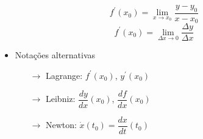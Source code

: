 \begin{frame}
\begin{columns}[onlytextwidth]
\begin{column}{0.5\textwidth}
\begin{itemize}
        \begin{equation*}
          f^{\prime}(x_{0}) = \lim_{x\to x_{0}}\frac{y - y_{0}}{x - x_{0}}
        \end{equation*}
        \begin{equation*}
          f^{\prime}(x_{0}) = \lim_{\Delta x\to 0}\frac{\Delta y}{\Delta x}
        \end{equation*}
      \end{itemize}
      \begin{itemize}
        \item Notações alternativas
        \begin{itemize}
          \item[$\to$] Lagrange: $f^{\prime}(x_{0})$, $y^{\prime}(x_{0})$
          \item[$\to$] Leibniz: $\dfrac{dy}{dx}(x_{0})$, $\dfrac{df}{dx}(x_{0})$
          \item[$\to$] Newton: $\dot{x}(t_{0}) = \dfrac{dx}{dt}(t_{0})$
        \end{itemize}
      \end{itemize}
    \end{column}
  \end{columns}
\end{frame}

